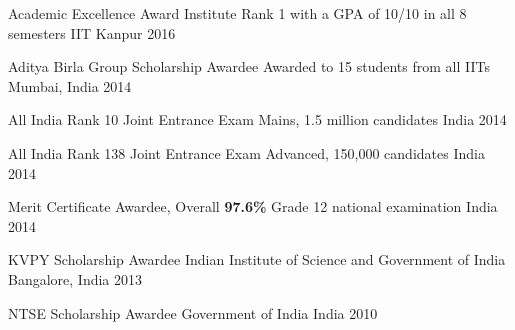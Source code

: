 
\vspace{-0.3cm}



\begin{cvhonors}


  \cvhonor
  {Academic Excellence Award} %
  {Institute Rank 1 with a GPA of 10/10 in all 8 semesters} %
  {IIT Kanpur} %
  {2016} %

  \cvhonor
  {Aditya Birla Group Scholarship Awardee}
  {Awarded to 15 students from all IITs}
  {Mumbai, India}
  {2014}

  \cvhonor
  {All India Rank 10} %
  {Joint Entrance Exam Mains, 1.5 million candidates} %
  {India} %
  {2014} %


  \cvhonor
  {All India Rank 138} %
  {Joint Entrance Exam Advanced, 150,000 candidates} %
  {India} %
  {2014} %

  \cvhonor
  {Merit Certificate Awardee, Overall \textbf{97.6\%}}
  {Grade 12 national examination}
  {India}
  {2014}

  \cvhonor
  {KVPY Scholarship Awardee}
  {Indian Institute of Science and Government of India}
  {Bangalore, India}
  {2013}

  \cvhonor
  {NTSE Scholarship Awardee}
  {Government of India}
  {India}
  {2010}


\end{cvhonors}

